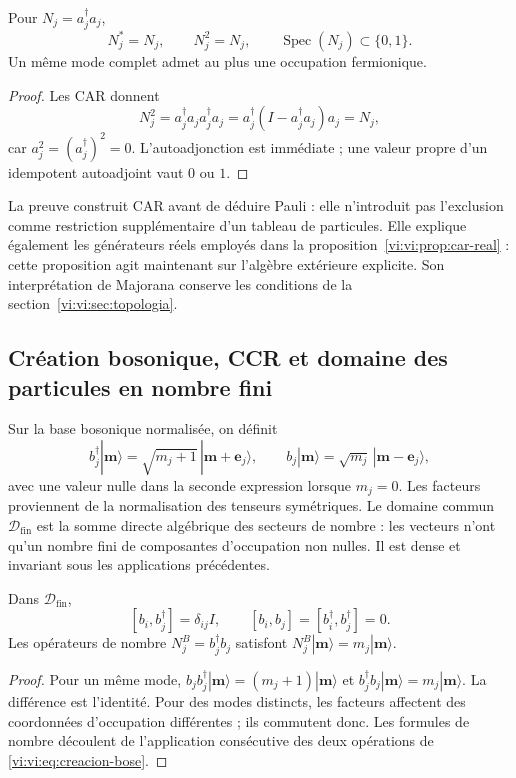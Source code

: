 \begin{corollary}
\label{vi:vi:cor:pauli-ocupacion}
Pour \(N_j=a_j^\dagger a_j\),
\[
 N_j^*=N_j,\qquad N_j^2=N_j,\qquad
 \operatorname{Spec}(N_j)\subset\{0,1\}.
\]
Un même mode complet admet au plus une occupation fermionique.
\end{corollary}
\begin{proof}
Les CAR donnent
\[
 N_j^2=a_j^\dagger a_ja_j^\dagger a_j
 =a_j^\dagger(I-a_j^\dagger a_j)a_j=N_j,
\]
car \(a_j^2=(a_j^\dagger)^2=0\). L’autoadjonction est immédiate ;
une valeur propre d’un idempotent autoadjoint vaut \(0\) ou \(1\).
\end{proof}

La preuve construit CAR avant de déduire Pauli : elle n’introduit pas
l’exclusion comme restriction supplémentaire d’un tableau de particules.
Elle explique également les générateurs réels employés dans la
proposition~\ref{vi:vi:prop:car-real} : cette proposition agit maintenant
sur l’algèbre extérieure explicite. Son interprétation de Majorana
conserve les conditions de la section~\ref{vi:vi:sec:topologia}.

\subsection{Création bosonique, CCR et domaine des particules en nombre fini}
\label{vi:vi:subsec:ccr-construccion}

Sur la base bosonique normalisée, on définit
\begin{equation}
 b_j^\dagger|\boldsymbol m\rangle=
 \sqrt{m_j+1}\,|\boldsymbol m+\boldsymbol e_j\rangle,
 \qquad
 b_j|\boldsymbol m\rangle=
 \sqrt{m_j}\,|\boldsymbol m-\boldsymbol e_j\rangle,
 \label{vi:vi:eq:creacion-bose}
\end{equation}
avec une valeur nulle dans la seconde expression lorsque \(m_j=0\).
Les facteurs proviennent de la normalisation des tenseurs symétriques.
Le domaine commun \(\mathcal D_{\mathrm{fin}}\) est la somme directe
algébrique des secteurs de nombre : les vecteurs n’ont qu’un
nombre fini de composantes d’occupation non nulles. Il est dense et
invariant sous les applications précédentes.

\begin{theorem}
\label{vi:vi:thm:ccr-construidas}
Dans \(\mathcal D_{\mathrm{fin}}\),
\[
 [b_i,b_j^\dagger]=\delta_{ij}I,\qquad
 [b_i,b_j]=[b_i^\dagger,b_j^\dagger]=0.
\]
Les opérateurs de nombre \(N_j^B=b_j^\dagger b_j\) satisfont
\(N_j^B|\boldsymbol m\rangle=m_j|\boldsymbol m\rangle\).
\end{theorem}
\begin{proof}
Pour un même mode,
\(b_jb_j^\dagger|\boldsymbol m\rangle=(m_j+1)|\boldsymbol m\rangle\)
et \(b_j^\dagger b_j|\boldsymbol m\rangle=m_j|\boldsymbol m\rangle\).
La différence est l’identité. Pour des modes distincts, les facteurs
affectent des coordonnées d’occupation différentes ; ils commutent donc.
Les formules de nombre découlent de l’application consécutive des deux
opérations de \eqref{vi:vi:eq:creacion-bose}.
\end{proof}


